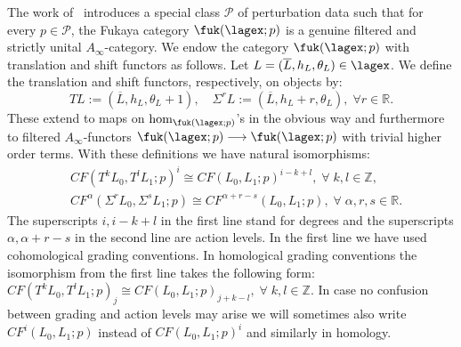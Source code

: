 The work of~\cite{Amb:fil-fuk} introduces a special class
$\mathcal{P}$ of perturbation data such that for every
$p \in \mathcal{P}$, the Fukaya category $\fuk(\lagex;p)$ is a genuine
filtered and strictly unital $A_{\infty}$-category.  We endow the
category $\fuk(\lagex;p)$ with translation and shift functors as
follows. Let $L = (\overline{L}, h_L, \theta_L) \in \lagex$. We define
the translation and shift functors, respectively, on objects by:
\begin{equation} \label{eq:T-Sigma-ex-1} TL := (\overline{L}, h_L,
  \theta_L+1), \quad \Sigma^r L := (\overline{L}, h_L+r, \theta_L), \;
  \forall r \in \mathbb{R}.
\end{equation}
These extend to maps on $\hom_{\fuk(\lagex;p)}$'s in the obvious way
and furthermore to filtered $A_{\infty}$-functors
$\fuk(\lagex;p) \longrightarrow \fuk(\lagex;p)$ with trivial higher
order terms.  With these definitions we have natural isomorphisms:
\begin{equation} \label{eq:T-Sigma-ex-2}
  \begin{aligned}
    & CF(T^kL_0, T^lL_1; p)^i \cong
    CF(L_0, L_1; p)^{i-k+l}, \; \forall \; k,l \in \mathbb{Z}, \\
    & CF^{\alpha}(\Sigma^rL_0, \Sigma^sL_1;p) \cong
    CF^{\alpha+r-s}(L_0, L_1; p), \; \forall \; \alpha, r, s \in
    \mathbb{R}.
  \end{aligned}
\end{equation}
The superscripts $i, i-k+l$ in the first line stand for degrees and
the superscripts $\alpha, \alpha+r-s$ in the second line are action
levels.  In the first line we have used cohomological grading
conventions. In homological grading conventions the isomorphism from
the first line takes the following form:
$CF(T^kL_0, T^lL_1; p)_j \cong CF(L_0, L_1; p)_{j+k-l}, \; \forall \;
k,l \in \mathbb{Z}$. In case no confusion between grading and  action levels may arise
we will sometimes also write $CF^i(L_0, L_1;p)$ instead of
$CF(L_0, L_1; p)^i$ and similarly in homology.

